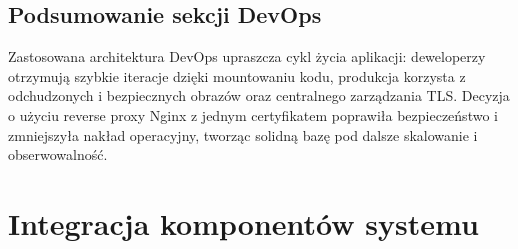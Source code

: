 \subsection{Podsumowanie sekcji DevOps}

Zastosowana architektura DevOps upraszcza cykl życia aplikacji: deweloperzy otrzymują szybkie iteracje dzięki mountowaniu kodu, produkcja korzysta z odchudzonych i bezpiecznych obrazów oraz centralnego zarządzania TLS. Decyzja o użyciu reverse proxy Nginx z jednym certyfikatem poprawiła bezpieczeństwo i zmniejszyła nakład operacyjny, tworząc solidną bazę pod dalsze skalowanie i obserwowalność.



\section{Integracja komponentów systemu}

